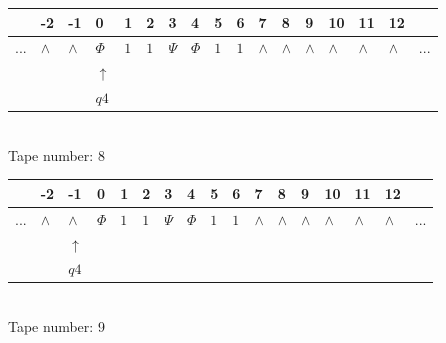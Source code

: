 \documentclass[11pt]{article}
\begin{document}
\begin{table}[H]
\centering
\begin{tabular}{lllllllllllllllll}
 & -2 & -1 & 0 & 1 & 2 & 3 & 4 & 5 & 6 & 7 & 8 & 9 & 10 & 11 & 12 & \\
\hline
$...$ & \multicolumn{1}{|l|}{$\wedge$} & \multicolumn{1}{|l|}{$\wedge$} & \multicolumn{1}{|l|}{$\Phi$} & \multicolumn{1}{|l|}{$1$} & \multicolumn{1}{|l|}{$1$} & \multicolumn{1}{|l|}{$\Psi$} & \multicolumn{1}{|l|}{$\Phi$} & \multicolumn{1}{|l|}{$1$} & \multicolumn{1}{|l|}{$1$} & \multicolumn{1}{|l|}{$\wedge$} & \multicolumn{1}{|l|}{$\wedge$} & \multicolumn{1}{|l|}{$\wedge$} & \multicolumn{1}{|l|}{$\wedge$} & \multicolumn{1}{|l|}{$\wedge$} & \multicolumn{1}{|l|}{$\wedge$} & $...$\\
\hline
&  &  & $\uparrow$ &  &  &  &  &  &  &  &  &  &  &  &  &  \\
&  &  & $ q4 $ &  &  &  &  &  &  &  &  &  &  &  &  &  \\
\end{tabular}
\\
Tape number: 8
\noindent\makebox[\linewidth]{\hdashrule{\textwidth}{1pt}{1pt}}\end{table}

\begin{table}[H]
\centering
\begin{tabular}{lllllllllllllllll}
 & -2 & -1 & 0 & 1 & 2 & 3 & 4 & 5 & 6 & 7 & 8 & 9 & 10 & 11 & 12 & \\
\hline
$...$ & \multicolumn{1}{|l|}{$\wedge$} & \multicolumn{1}{|l|}{$\wedge$} & \multicolumn{1}{|l|}{$\Phi$} & \multicolumn{1}{|l|}{$1$} & \multicolumn{1}{|l|}{$1$} & \multicolumn{1}{|l|}{$\Psi$} & \multicolumn{1}{|l|}{$\Phi$} & \multicolumn{1}{|l|}{$1$} & \multicolumn{1}{|l|}{$1$} & \multicolumn{1}{|l|}{$\wedge$} & \multicolumn{1}{|l|}{$\wedge$} & \multicolumn{1}{|l|}{$\wedge$} & \multicolumn{1}{|l|}{$\wedge$} & \multicolumn{1}{|l|}{$\wedge$} & \multicolumn{1}{|l|}{$\wedge$} & $...$\\
\hline
&  & $\uparrow$ &  &  &  &  &  &  &  &  &  &  &  &  &  &  \\
&  & $ q4 $ &  &  &  &  &  &  &  &  &  &  &  &  &  &  \\
\end{tabular}
\\
Tape number: 9
\noindent\makebox[\linewidth]{\hdashrule{\textwidth}{1pt}{1pt}}\end{table}
\end{document}

